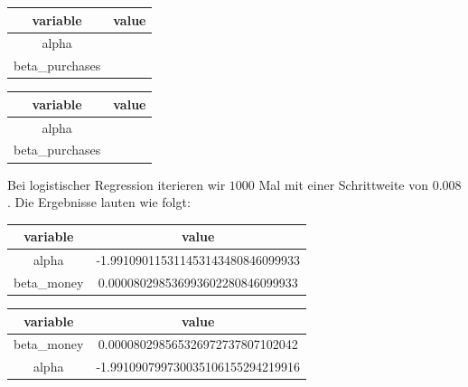 \begin{center}
  \begin{tabular}{|c|c|}\hline
    \textbf{variable} & \textbf{value} \\ \hline
    alpha &  \\ \hline
    beta\_purchases &  \\ \hline
  \end{tabular}

  \begin{tabular}{|c|c|}\hline
    \textbf{variable} & \textbf{value} \\ \hline
    alpha &  \\ \hline
    beta\_purchases &  \\ \hline
  \end{tabular}
\end{center}

Bei logistischer Regression iterieren wir $1000$ Mal mit einer Schrittweite von $0.008$. Die Ergebnisse lauten wie folgt:

\begin{center}
  \begin{tabular}{|c|c|}\hline
    \textbf{variable} & \textbf{value} \\ \hline
    alpha & -1.991090115311453143480846099933 \\ \hline
    beta\_money & 0.000080298536993602280846099933 \\ \hline
  \end{tabular}

  \begin{tabular}{|c|c|}\hline
    \textbf{variable} & \textbf{value} \\ \hline
    beta\_money & 0.000080298565326972737807102042 \\ \hline
    alpha & -1.991090799730035106155294219916 \\ \hline
  \end{tabular}
\end{center}
